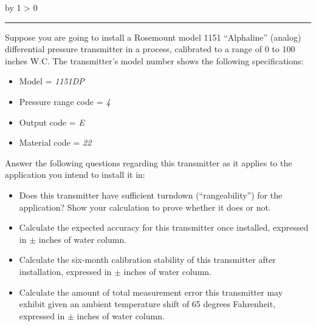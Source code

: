 \documentclass[12pt,a4paper]{article}
\def\oppgave{
            \advance\questnum by 1
            \ifnum \questnum > 0
                 \hrule
                 \vskip 3pt
                 \leftline{Oppgave \the\questnum}
                 \vskip 3pt \fi}
\begin{document}

\vfil \eject 



\oppgave{} 

Suppose you are going to install a Rosemount model 1151 ``Alphaline'' (analog) differential pressure transmitter in a process, calibrated to a range of 0 to 100 inches W.C.  The transmitter's model number shows the following specifications:

\begin{itemize}
\item{} Model = {\it 1151DP}
\item{} Pressure range code = {\it 4}
\item{} Output code = {\it E}
\item{} Material code = {\it 22}
\end{itemize}

Answer the following questions regarding this transmitter as it applies to the application you intend to install it in:

\vskip 20pt

\begin{itemize}
\item{} Does this transmitter have sufficient turndown (``rangeability'') for the application?  Show your calculation to prove whether it does or not.

\vskip 50pt

\item{} Calculate the expected accuracy for this transmitter once installed, expressed in $\pm$ inches of water column.

\vskip 50pt

\item{} Calculate the six-month calibration stability of this transmitter after installation, expressed in $\pm$ inches of water column.

\vskip 50pt

\item{} Calculate the amount of total measurement error this transmitter may exhibit given an ambient temperature shift of 65 degrees Fahrenheit, expressed in $\pm$ inches of water column.


\end{itemize}
\end{document}
